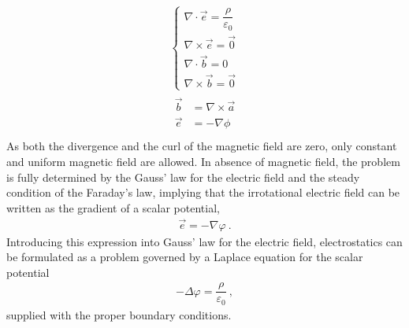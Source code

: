 \documentclass[letterpaper,10pt,english]{jupyterBook}
\begin{document}
\sphinxAtStartPar
{}
\begin{equation*}
\begin{split}\begin{cases}
    \nabla \cdot \vec{e} = \dfrac{\rho}{\varepsilon_0} \\
    \nabla \times \vec{e} = \vec{0} \\ 
    \nabla \cdot \vec{b} = 0 \\
    \nabla \times \vec{b} = \vec{0}
  \end{cases}\end{split}
\end{equation*}
\sphinxAtStartPar
{}
\begin{equation*}
\begin{split}\begin{aligned}
      \vec{b} & = \nabla \times \vec{a} \\
      \vec{e} & = - \nabla \phi \\
   \end{aligned}\end{split}
\end{equation*}
\sphinxAtStartPar
As both the divergence and the curl of the magnetic field are zero, only constant and uniform magnetic field are allowed.
In absence of magnetic field, the problem is fully determined by the Gauss’ law for the electric field and the steady condition of the Faraday’s law, implying that the irrotational electric field can be written as the gradient of a scalar potential,
\begin{equation*}
\begin{split}\vec{e} = - \nabla \varphi \ .\end{split}
\end{equation*}
\sphinxAtStartPar
Introducing this expression into Gauss’ law for the electric field, electrostatics can be formulated as a problem governed by a Laplace equation for the scalar potential
\begin{equation*}
\begin{split}-\Delta \varphi = \dfrac{\rho}{\varepsilon_0} \ ,\end{split}
\end{equation*}
\sphinxAtStartPar
supplied with the proper boundary conditions.  
\end{document}
